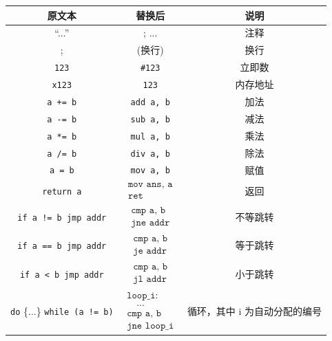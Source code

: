 \begin{center}
\begin{tabular}{c|c|c}
    \hline 
    \textbf{原文本} & \textbf{替换后} & \textbf{说明} \\
    \hline
    ``...'' & ; ... & 注释 \\[5pt]
    ; & (换行) & 换行 \\[5pt]
    \texttt{123} & \texttt{\#123} & 立即数 \\[5pt]
    \texttt{x123} & \texttt{123} & 内存地址 \\[5pt]
    \texttt{a += b} & \texttt{add a, b} & 加法 \\[5pt]
    \texttt{a -= b} & \texttt{sub a, b} & 减法 \\[5pt]
    \texttt{a *= b} & \texttt{mul a, b} & 乘法 \\[5pt]
    \texttt{a /= b} & \texttt{div a, b} & 除法 \\[5pt]
    \texttt{a = b} & \texttt{mov a, b} & 赋值 \\[5pt]
    \texttt{return a} & $\boxed{\begin{array}{l} \texttt{mov ans, a} \\ \texttt{ret} \end{array}}$ & 返回 \\[20pt] 
    \texttt{if a != b jmp addr} & $\boxed{\begin{array}{l} \texttt{cmp a, b} \\ \texttt{jne addr} \end{array}}$ & 不等跳转 \\[20pt]
    \texttt{if a == b jmp addr} & $\boxed{\begin{array}{l} \texttt{cmp a, b} \\ \texttt{je addr} \end{array}}$ & 等于跳转 \\[20pt]
    \texttt{if a < b jmp addr} & $\boxed{\begin{array}{l} \texttt{cmp a, b} \\ \texttt{jl addr} \end{array}}$ & 小于跳转 \\[20pt]
    \texttt{do} \{...\} \texttt{while (a != b)} & $\boxed{\begin{array}{l} \texttt{loop\_i:} \\ \quad\texttt{...} \\ \texttt{cmp a, b} \\ \texttt{jne loop\_i} \end{array}}$ & 循环，其中 i 为自动分配的编号 \\[40pt]
    \hline
\end{tabular}
\end{center}

